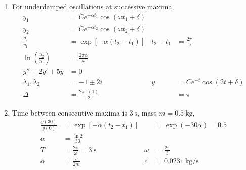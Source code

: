 \begin{enumerate}
    \item For underdamped oscillations at successive maxima,
          \begin{align}
              y_{1}                                 & = Ce^{-\alpha t_{1}}
              \cos(\omega t_{1} + \delta)                                              \\
              y_{2}                                 & = Ce^{-\alpha t_{2}}
              \cos(\omega t_{2} + \delta)                                              \\
              \frac{y_{2}}{y_{1}}                   & = \exp[-\alpha(t_{2} - t_{1})] &
              t_{2} - t_{1}                         & = \frac{2\pi}{\omega}            \\
              \ln\left( \frac{y_{2}}{y_{1}} \right) & = \frac{2\pi \alpha}{\omega}     \\
              y'' + 2y' + 5y                        & = 0                              \\
              \lambda_{1}, \lambda_{2}              & = -1 \pm 2i                    &
              y                                     & = Ce^{-t}\cos(2t + \delta)       \\
              \Delta                                & = \frac{2\pi \cdot (1)}{2}     &
                                                    & = \pi
          \end{align}

    \item Time between consecutive maxima is $ \SI{3}{\s} $, mass $ m = \SI{0.5}{\kg} $,
          \begin{align}
              \frac{y(30)}{y(0)} & = \exp\left[ -\alpha(t_{2} - t_{1}) \right] &
                                 & = \exp(-30\alpha) = 0.5                       \\
              \alpha             & = \frac{\ln 2}{30}                            \\
              T                  & = \frac{2\pi}{\omega} = \SI{3}{\s}          &
              \omega             & = \frac{2\pi}{3}                              \\
              \alpha             & = \frac{c}{2m}                              &
              c                  & = \SI{0.0231}{\kg\per\s}
          \end{align}


\end{enumerate}
